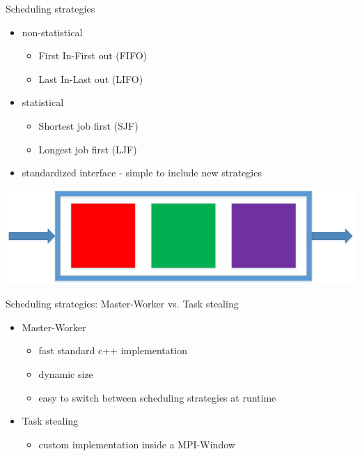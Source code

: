 	\begin{frame}{Scheduling strategies}
	\begin{minipage}[]{.7\textwidth}%
			\begin{itemize}
		\item<1-> non-statistical
		\begin{itemize}
			\item First In-First out (FIFO)
			\item Last In-Last out (LIFO)
		\end{itemize}
		\item<2-> statistical
		\begin{itemize}
			\item Shortest job first (SJF)
			\item Longest job first (LJF)
		\end{itemize}
		\item<3-> standardized interface - simple to include new strategies
		\end{itemize}
\end{minipage}%
\begin{minipage}[]{.3\textwidth}%
  \vspace{-\ht\strutbox}\includegraphics[width=\textwidth]{images/fifo}%
\end{minipage}		
		
	\end{frame}
	\begin{frame}{Scheduling strategies: Master-Worker vs. Task stealing}
		\begin{itemize}
			\item<1-> Master-Worker
				\begin{itemize}
					\item fast standard c++ implementation
					\item dynamic size
					\item easy to switch between scheduling strategies at runtime	
				\end{itemize}
			
			\item<2-> Task stealing
					\begin{itemize}
						\item custom implementation inside a MPI-Window
					\end{itemize}
			
		\end{itemize}
	\end{frame}
